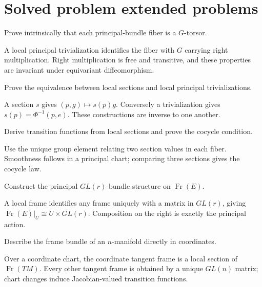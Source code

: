 \section{Solved problem extended problems}

\begin{problem}\label{prob:vii08-01}
Prove intrinsically that each principal-bundle fiber is a \(G\)-torsor.
\end{problem}
\begin{solution}
A local principal trivialization identifies the fiber with \(G\) carrying right multiplication. Right multiplication is free and transitive, and these properties are invariant under equivariant diffeomorphism.
\end{solution}

\begin{problem}\label{prob:vii08-02}
Prove the equivalence between local sections and local principal trivializations.
\end{problem}
\begin{solution}
A section \(s\) gives \((p,g)\mapsto s(p)g\). Conversely a trivialization gives \(s(p)=\Phi^{-1}(p,e)\). These constructions are inverse to one another.
\end{solution}

\begin{problem}\label{prob:vii08-03}
Derive transition functions from local sections and prove the cocycle condition.
\end{problem}
\begin{solution}
Use the unique group element relating two section values in each fiber. Smoothness follows in a principal chart; comparing three sections gives the cocycle law.
\end{solution}

\begin{problem}\label{prob:vii08-04}
Construct the principal \(GL(r)\)-bundle structure on \(\operatorname{Fr}(E)\).
\end{problem}
\begin{solution}
A local frame identifies any frame uniquely with a matrix in \(GL(r)\), giving \(\operatorname{Fr}(E)|_U\cong U\times GL(r)\). Composition on the right is exactly the principal action.
\end{solution}

\begin{problem}\label{prob:vii08-05}
Describe the frame bundle of an \(n\)-manifold directly in coordinates.
\end{problem}
\begin{solution}
Over a coordinate chart, the coordinate tangent frame is a local section of \(\operatorname{Fr}(TM)\). Every other tangent frame is obtained by a unique \(GL(n)\) matrix; chart changes induce Jacobian-valued transition functions.
\end{solution}

